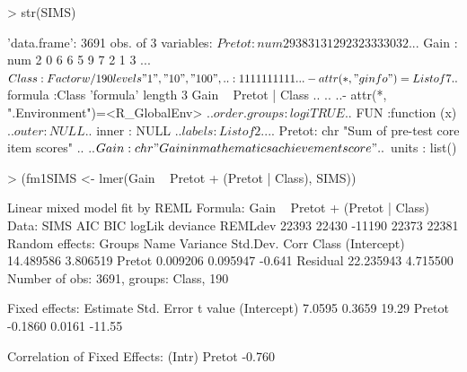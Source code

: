 \documentclass[12pt]{article}
\begin{document}
\begin{Schunk}
\begin{Sinput}
> str(SIMS)
\end{Sinput}
\begin{Soutput}
'data.frame':	3691 obs. of  3 variables:
 $ Pretot: num  29 38 31 31 29 23 23 33 30 32 ...
 $ Gain  : num  2 0 6 6 5 9 7 2 1 3 ...
 $ Class : Factor w/ 190 levels "1","10","100",..: 1 1 1 1 1 1 1 1 1 1 ...
 - attr(*, "ginfo")=List of 7
  ..$ formula     :Class 'formula' length 3 Gain ~ Pretot | Class
  .. .. ..- attr(*, ".Environment")=<R_GlobalEnv> 
  ..$ order.groups: logi TRUE
  ..$ FUN         :function (x)  
  ..$ outer       : NULL
  ..$ inner       : NULL
  ..$ labels      :List of 2
  .. ..$ Pretot: chr "Sum of pre-test core item scores"
  .. ..$ Gain  : chr "Gain in mathematics achievement score"
  ..$ units       : list()
\end{Soutput}
\begin{Sinput}
> (fm1SIMS <- lmer(Gain ~ Pretot + (Pretot | Class), SIMS))
\end{Sinput}
\begin{Soutput}
Linear mixed model fit by REML 
Formula: Gain ~ Pretot + (Pretot | Class) 
   Data: SIMS 
   AIC   BIC logLik deviance REMLdev
 22393 22430 -11190    22373   22381
Random effects:
 Groups   Name        Variance  Std.Dev. Corr   
 Class    (Intercept) 14.489586 3.806519        
          Pretot       0.009206 0.095947 -0.641 
 Residual             22.235943 4.715500        
Number of obs: 3691, groups: Class, 190

Fixed effects:
            Estimate Std. Error t value
(Intercept)   7.0595     0.3659   19.29
Pretot       -0.1860     0.0161  -11.55

Correlation of Fixed Effects:
       (Intr)
Pretot -0.760
\end{Soutput}
\end{Schunk}
\end{document}
